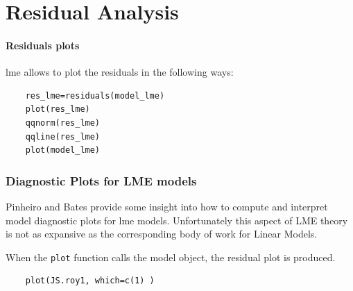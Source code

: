 \documentclass[Main.tex]{subfiles}
\begin{document}
\tableofcontents
\newpage	

\chapter{Residual Analysis}


\subsubsection{Residuals plots}

lme allows to plot the residuals in the following ways:

\begin{framed}
	\begin{verbatim}
	res_lme=residuals(model_lme)
	plot(res_lme)
	qqnorm(res_lme)
	qqline(res_lme)
	plot(model_lme)
	\end{verbatim}
\end{framed}



\subsection{Diagnostic Plots for LME models}

Pinheiro and Bates provide some insight into how to compute and interpret model diagnostic plots for lme models. Unfortunately this aspect of LME theory is not as expansive as the corresponding body of work for Linear Models.

When the \texttt{plot} function calls the model object, the residual plot is produced.





\begin{framed}
	\begin{verbatim}
	plot(JS.roy1, which=c(1) )
	\end{verbatim}
\end{framed}
\end{document}
